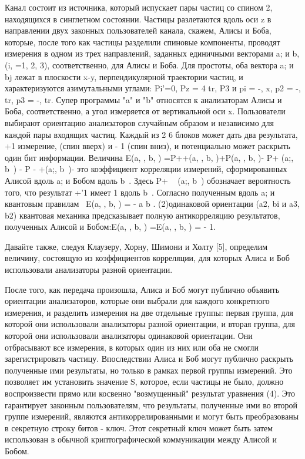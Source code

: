 Канал состоит из источника, который испускает пары частиц со спином 2, находящихся в синглетном состоянии. Частицы разлетаются вдоль оси z в направлении двух законных пользователей канала, скажем, Алисы и Боба, которые, после того как частицы разделили спиновые компоненты, проводят измерения в одном из трех направлений, заданных единичными векторами a; и b, (i, =1, 2, 3), соответственно, для Алисы и Боба. Для простоты, оба вектора a; и bj лежат в плоскости x-y, перпендикулярной траектории частиц, и характеризуются азимутальными углами: Pi'=0, Pz = 4 tr, P3 и pi = -, x, p2 = -, tr, p3 = -, tr. Супер программы "a" и "b" относятся к анализаторам Алисы и Боба, соответственно, а угол измеряется от вертикальной оси x. Пользователи выбирают ориентацию анализаторов случайным образом и независимо для каждой пары входящих частиц. Каждый из 2 6 блоков может дать два результата, +1 измерение, (спин вверх) и - 1 (спин вниз), и потенциально может раскрыть один бит информации.
Величина E(a, , b, ) =P++(a, , b, )+P(a, , b, )- P+ (a;, b~) - P - +(a;, b~)- это коэффициент корреляции измерений, сформированных Алисой вдоль a; и Бобом вдоль b~. Здесь P+ ~ (a;, b~) обозначает вероятность того, что результат +'1 имеет 1 вдоль b~. Согласно полученным вдоль a; и квантовым правилам~ E(a, , b, ) = - a b . (2)одинаковой ориентации (a2, bi и a3, b2) квантовая механика предсказывает полную антикорреляцию результатов, полученных Алисой и Бобом:E(a, , b, ) =E(a, , b, ) = - 1.

Давайте также, следуя Клаузеру, Хорну, Шимони и Холту [5], определим величину, состоящую из коэффициентов корреляции, для которых Алиса и Боб использовали анализаторы разной ориентации.

После того, как передача произошла, Алиса и Боб могут публично объявить ориентации анализаторов, которые они выбрали для каждого конкретного измерения, и разделить измерения на две отдельные группы: первая группа, для которой они использовали анализаторы разной ориентации, и вторая группа, для которой они использовали анализаторы одинаковой ориентации. Они отбрасывают все измерения, в которых один из них или оба не смогли зарегистрировать частицу. Впоследствии Алиса и Боб могут публично раскрыть полученные ими результаты, но только в рамках первой группы измерений. Это позволяет им установить значение S, которое, если частицы не было, должно воспроизвести прямо или косвенно "возмущенный" результат уравнения (4). Это гарантирует законным пользователям, что результаты, полученные ими во второй группе измерений, являются антикоррелированными и могут быть преобразованы в секретную строку битов - ключ. Этот секретный ключ может быть затем использован в обычной криптографической коммуникации между Алисой и Бобом.


